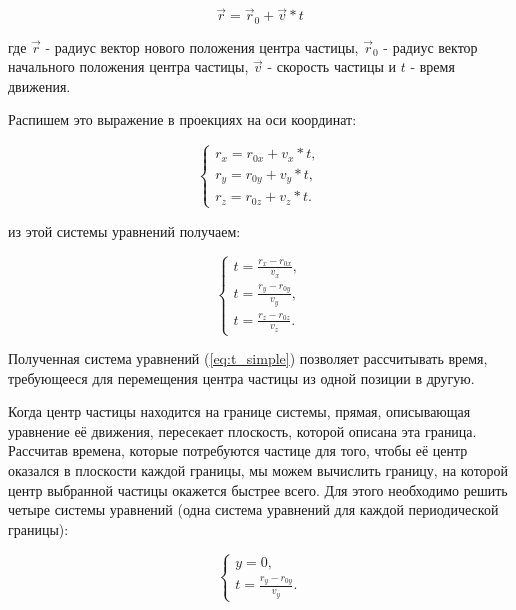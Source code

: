 \documentclass{article}
\begin{document}
\begin{equation}
\vec{r} = \vec{r}_0 + \vec{v}*t
\end{equation}

где $ \vec{r} $ - радиус вектор нового положения центра частицы, $ \vec{r}_0 $ - радиус вектор начального положения центра частицы, $ \vec{v} $ - скорость частицы и $ t $ - время движения.

Распишем это выражение в проекциях на оси координат:

\begin{equation}\label{eq:r_scalar}
    \begin{cases}
        r_x = r_{0x} + v_x * t,
        \\
        r_y = r_{0y} + v_y * t,
        \\
        r_z = r_{0z} + v_z * t.
    \end{cases}
\end{equation}

из этой системы уравнений получаем:

\begin{equation}\label{eq:t_simple}
    \begin{cases}
        t = \displaystyle\frac{r_x - r_{0x}}{v_x},
        \\
        t = \displaystyle\frac{r_y - r_{0y}}{v_y},
        \\
        t = \displaystyle\frac{r_z - r_{0z}}{v_z}.
    \end{cases}
\end{equation}

Полученная система уравнений (\ref{eq:t_simple}) позволяет рассчитывать время, требующееся для перемещения центра частицы из одной позиции в другую.

Когда центр частицы находится на границе системы, прямая, описывающая уравнение её движения, пересекает плоскость, которой описана эта граница. Рассчитав времена, которые потребуются частице для того, чтобы её центр оказался в плоскости каждой границы, мы можем вычислить границу, на которой центр выбранной частицы окажется быстрее всего. Для этого необходимо решить четыре системы уравнений (одна система уравнений для каждой периодической границы):

\begin{equation}
    \begin{cases}
        y = 0,
        \\
        t = \displaystyle\frac{r_y - r_{0y}}{v_y}.
    \end{cases}
\end{equation}
\end{document}
